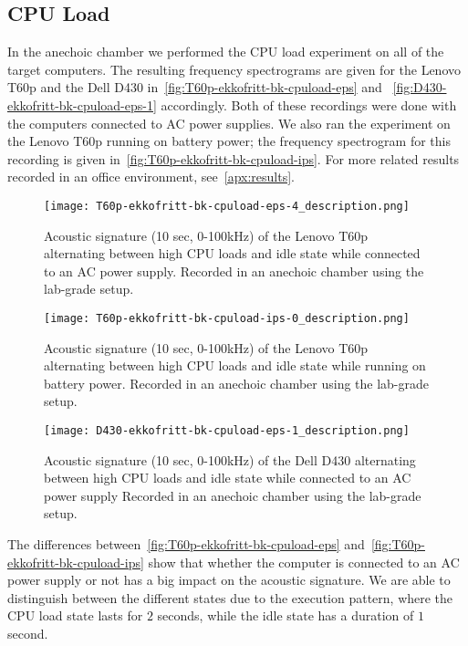 \subsection{CPU Load}\label{chp5:subsec:t60p_bk_results_cpuload}
In the anechoic chamber we performed the \gls{CPU} load experiment on all of the target computers.
The resulting frequency spectrograms are given for the Lenovo T60p and the Dell D430 in~\autoref{fig:T60p-ekkofritt-bk-cpuload-eps} and ~\autoref{fig:D430-ekkofritt-bk-cpuload-eps-1} accordingly.
Both of these recordings were done with the computers connected to \gls{AC} power supplies.
We also ran the experiment on the Lenovo T60p running on battery power; the frequency spectrogram for this recording is given in~\autoref{fig:T60p-ekkofritt-bk-cpuload-ips}.
For more related results recorded in an office environment, see~\autoref{apx:results}.


\begin{figure}[ht]
    \centering
    \texttt{[image: T60p-ekkofritt-bk-cpuload-eps-4\_description.png]}
    \caption{Acoustic signature (10 sec, 0-100kHz) of the Lenovo T60p alternating between high CPU loads and idle state while connected to an \gls{AC} power supply. 
        Recorded in an anechoic chamber using the lab-grade setup.}
    \label{fig:T60p-ekkofritt-bk-cpuload-eps}
\end{figure}


\begin{figure}[ht]
    \centering
    \texttt{[image: T60p-ekkofritt-bk-cpuload-ips-0\_description.png]}
    \caption{Acoustic signature (10 sec, 0-100kHz) of the Lenovo T60p alternating between high CPU loads and idle state while running on battery power. 
        Recorded in an anechoic chamber using the lab-grade setup.}
    \label{fig:T60p-ekkofritt-bk-cpuload-ips}
\end{figure}


\begin{figure}[ht]
    \centering
    \texttt{[image: D430-ekkofritt-bk-cpuload-eps-1\_description.png]}
    \caption{Acoustic signature (10 sec, 0-100kHz) of the Dell D430 alternating between high CPU loads and idle state while connected to an \gls{AC} power supply
        Recorded in an anechoic chamber using the lab-grade setup.}
    \label{fig:D430-ekkofritt-bk-cpuload-eps-1}
\end{figure}

The differences between~\autoref{fig:T60p-ekkofritt-bk-cpuload-eps} and~\autoref{fig:T60p-ekkofritt-bk-cpuload-ips} show that whether the computer is connected to an \gls{AC} power supply or not has a big impact on the acoustic signature.
We are able to distinguish between the different states due to the execution pattern, where the CPU load state lasts for $2$ seconds, while the idle state has a duration of $1$ second.

